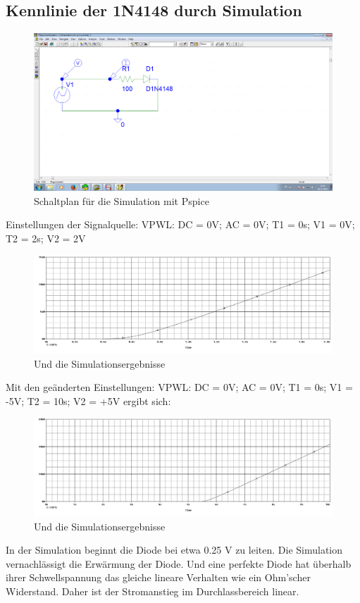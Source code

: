 \subsection{Kennlinie der 1N4148 durch Simulation}
\begin{figure}[H]
	\centering
	\includegraphics[width=\linewidth]{versuch2/spice/v2_4_1_schematic.png}
	\caption{Schaltplan für die Simulation mit Pspice}
\end{figure}
Einstellungen der Signalquelle: VPWL: DC = 0V; AC = 0V; T1 = 0s; V1 = 0V; T2 = 2s; V2 = 2V\\
\begin{figure}[H]
	\centering
	\includegraphics[width=\linewidth]{versuch2/spice/v2_4_1_simulation.png}
	\caption{Und die Simulationsergebnisse}
\end{figure}
Mit den geänderten Einstellungen: VPWL: DC = 0V; AC = 0V; T1 = 0s; V1 = -5V; T2 = 10s; V2 = +5V ergibt sich:
\begin{figure}[H]
	\centering
	\includegraphics[width=\linewidth]{versuch2/spice/v2_4_2_simulation.png}
	\caption{Und die Simulationsergebnisse}
\end{figure}
In der Simulation beginnt die Diode bei etwa 0.25 V zu leiten. Die Simulation vernachlässigt die Erwärmung der Diode. Und eine perfekte Diode hat überhalb ihrer Schwellspannung das gleiche lineare Verhalten wie ein Ohm'scher Widerstand. Daher ist der Stromanstieg im Durchlassbereich linear.

